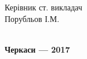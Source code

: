 \documentclass[../main.tex]{subfiles}
\begin{document}
\begin{titlepage}
{\begin{flushright}
\begin{minipage}[t]{4.2cm}
\begin{flushright}
				\end{flushright}
			\end{minipage}
		\end{flushright}
		\begin{flushright}
			\begin{minipage}[t]{6.8cm}
				\begin{flushright}
					Керівник ст. викладач \\
					Порубльов І.М. \\
					\hrulefill \\
				\end{flushright}
			\end{minipage}
		\end{flushright}
    }
    \vfill
    \vfill
    {\centering\bfseries Черкаси — 2017 \\ }
\end{titlepage}
\end{document}
